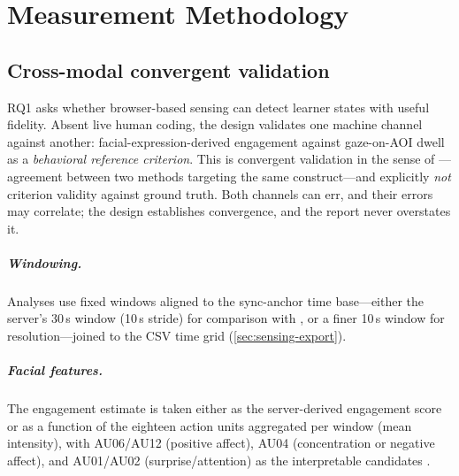 \chapter{Measurement Methodology}
\label{ch:methodology}


\section{Cross-modal convergent validation}
\label{sec:methodology-validation}

RQ1 asks whether browser-based sensing can detect learner states with
useful fidelity. Absent live human coding, the design validates one
machine channel against another: facial-expression-derived engagement
against gaze-on-AOI dwell as a \emph{behavioral reference criterion}. This
is convergent validation in the sense of \citet{campbell1959}---agreement
between two methods targeting the same construct---and explicitly
\emph{not} criterion validity against ground truth. Both channels can err,
and their errors may correlate; the design establishes convergence, and
the report never overstates it.

\paragraph{Windowing.} Analyses use fixed windows aligned to the
sync-anchor time base---either the server's 30\,s window (10\,s stride)
for comparison with , or a finer 10\,s
window for resolution---joined to the CSV time grid
(\cref{sec:sensing-export}).

\paragraph{Facial features.} The engagement estimate is taken either as
the server-derived engagement score or as a function of the eighteen
action units aggregated per window (mean intensity), with AU06/AU12
(positive affect), AU04 (concentration or negative affect), and AU01/AU02
(surprise/attention) as the interpretable candidates
\citep{grafsgaard2013}.

